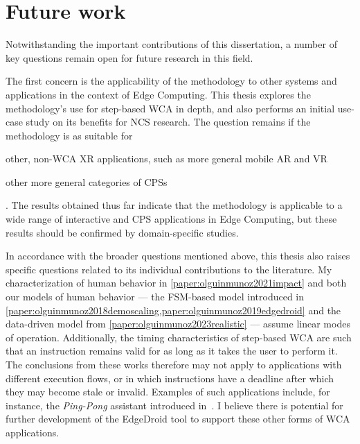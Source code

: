 \section{Future work}

Notwithstanding the important contributions of this dissertation, a number of key questions remain open for future research in this field.

The first concern is the applicability of the methodology to other systems and applications in the context of Edge Computing.
This thesis explores the methodology's use for step-based \gls{WCA} in depth, and also performs an initial use-case study on its benefits for \gls{NCS} research.
The question remains if the methodology is as suitable for
\begin{inlineenum}
    \item other, non-\gls{WCA} \gls{XR} applications, such as more general mobile \gls{AR} and \gls{VR}
    \item other more general categories of \glspl{CPS}
\end{inlineenum}.
The results obtained thus far indicate that the methodology is applicable to a wide range of interactive and \gls{CPS} applications in Edge Computing, but these results should be confirmed by domain-specific studies.

In accordance with the broader questions mentioned above, this thesis also raises specific questions related to its individual contributions to the literature.
My characterization of human behavior in \cref{paper:olguinmunoz2021impact} and both our models of human behavior --- the \gls{FSM}-based model introduced in \cref{paper:olguinmunoz2018demoscaling,paper:olguinmunoz2019edgedroid} and the data-driven model from \cref{paper:olguinmunoz2023realistic} --- assume linear modes of operation.
Additionally, the timing characteristics of step-based \gls{WCA} are such that an instruction remains valid for as long as it takes the user to perform it.
The conclusions from these works therefore may not apply to applications with different execution flows, or in which instructions have a deadline after which they may become stale or invalid.
Examples of such applications include, for instance, the \emph{Ping-Pong} assistant introduced in~\cite{chen2015early}.
I believe there is potential for further development of the EdgeDroid tool to support these other forms of \gls{WCA} applications.

